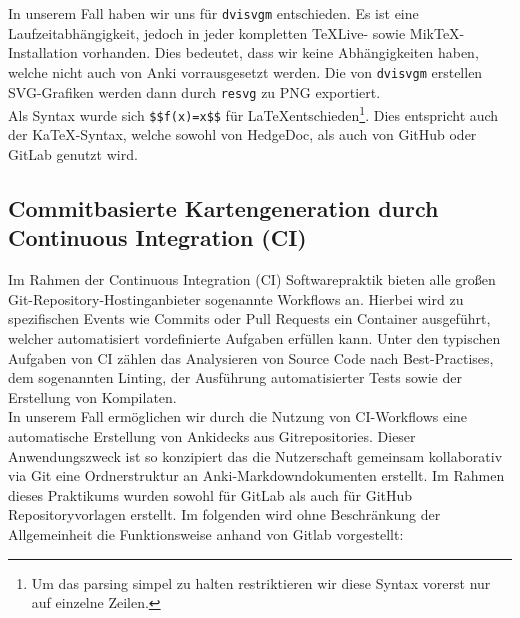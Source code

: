 \documentclass[ngerman]{article}
\begin{document}
In unserem Fall haben wir uns für \texttt{dvisvgm} entschieden. Es ist eine Laufzeitabhängigkeit, jedoch in jeder kompletten TeXLive- sowie MikTeX-Installation vorhanden. Dies bedeutet, dass wir keine Abhängigkeiten haben, welche nicht auch von Anki vorrausgesetzt werden. Die von \texttt{dvisvgm} erstellen SVG-Grafiken werden dann durch \texttt{resvg} \cite{resvg} zu PNG exportiert.\\

Als Syntax wurde sich \texttt{\$\$f(x)=x\$\$} für \LaTeX entschieden\footnote{Um das parsing simpel zu halten restriktieren wir diese Syntax vorerst nur auf einzelne Zeilen.}. Dies entspricht auch der KaTeX-Syntax, welche sowohl von HedgeDoc, als auch von GitHub oder GitLab genutzt wird.

\subsection{Commitbasierte Kartengeneration durch Continuous Integration (CI)}
Im Rahmen der Continuous Integration (CI) Softwarepraktik bieten alle großen Git-Repository-Hostinganbieter sogenannte Workflows an. Hierbei wird zu spezifischen Events wie Commits oder Pull Requests ein Container ausgeführt, welcher automatisiert vordefinierte Aufgaben erfüllen kann. Unter den typischen Aufgaben von CI zählen das Analysieren von Source Code nach Best-Practises, dem sogenannten Linting, der Ausführung automatisierter Tests sowie der Erstellung von Kompilaten.\\

In unserem Fall ermöglichen wir durch die Nutzung von CI-Workflows eine automatische Erstellung von Ankidecks aus Gitrepositories. Dieser Anwendungszweck ist so konzipiert das die Nutzerschaft gemeinsam kollaborativ via Git eine Ordnerstruktur an Anki-Markdowndokumenten erstellt. Im Rahmen dieses Praktikums wurden sowohl für GitLab \cite{GitlabTemplate} als auch für GitHub \cite{GithubTemplate} Repositoryvorlagen erstellt. Im folgenden wird ohne Beschränkung der Allgemeinheit die Funktionsweise anhand von Gitlab vorgestellt:
\end{document}
